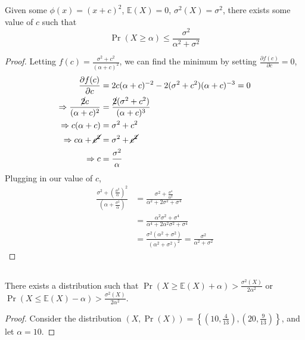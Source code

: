 \documentclass{article}
\newcommand{\E}{\mathbb{E}}
\begin{document}
\subsection{}

\begin{theorem}
    Given some \(\phi(x) = (x + c)^2\), \(\E(X) = 0\), \(\sigma^2(X) = \sigma^2\), there exists some value of \(c\) such that
    \begin{equation}
        \Pr(X \geqslant \alpha) \leqslant \frac{\sigma^2}{\alpha^2 + \sigma^2}
    \end{equation}
\end{theorem}
\begin{proof}
    Letting \(f(c) = \frac{\sigma^2 + c^2}{(\alpha + c)^2}\), we can find the minimum by setting \(\frac{\partial f(c)}{\partial c} = 0\),
    \begin{align}
        \frac{\partial f(c)}{\partial c} &= 2c (\alpha + c)^{-2} - 2 (\sigma^2 + c^2) (\alpha + c)^{-3} = 0 \\
        \Rightarrow \frac{\cancel{2}c}{(\alpha + c)^2} &= \frac{\cancel{2} (\sigma^2 + c^2)}{(\alpha + c)^3} \\
        \Rightarrow c (\alpha + c) &= \sigma^2 + c^2 \\
        \Rightarrow c\alpha + \cancel{c^2} &= \sigma^2 + \cancel{c^2} \\
        \Rightarrow c &= \frac{\sigma^2}{\alpha}
    \end{align}
    Plugging in our value of \(c\),
    \begin{align}
        \frac{\sigma^2 + \left(\frac{\sigma^2}{\alpha}\right)^2}{\left(\alpha + \frac{\sigma^2}{\alpha}\right)} &= \frac{\sigma^2 + \frac{\sigma^4}{\alpha^2}}{\alpha^2 + 2 \sigma^2 + \sigma^4} \\
        &= \frac{\alpha^2 \sigma^2 + \sigma^4}{\alpha^4 + 2 \alpha^2 \sigma^2 + \sigma^4} \\
        &= \frac{\sigma^2 (\alpha^2 + \sigma^2)}{(\alpha^2 + \sigma^2)^2} = \frac{\sigma^2}{\alpha^2 + \sigma^2}
    \end{align}
\end{proof}

\subsection{}

\begin{theorem}
    There exists a distribution such that \(\Pr(X \geqslant \E(X) + \alpha) > \frac{\sigma^2(X)}{2 \alpha^2}\) or \(\Pr(X \leqslant \E(X) - \alpha) > \frac{\sigma^2(X)}{2 \alpha^2}\).
\end{theorem}
\begin{proof}
    Consider the distribution \((X, \Pr(X)) = \left\{\left(10, \frac{4}{13}\right), \left(20, \frac{9}{13}\right)\right\}\), and let \(\alpha = 10\).
\end{proof}
\end{document}
